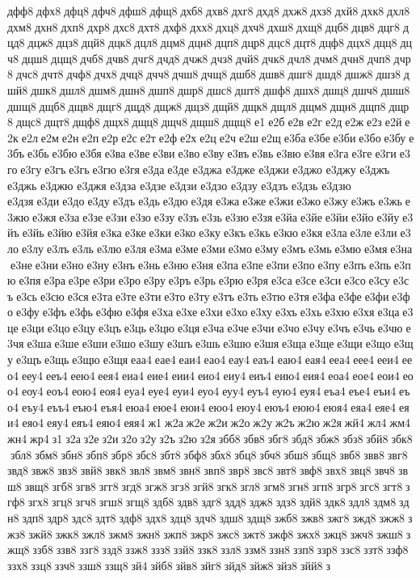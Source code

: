 дфф8 дфх8 дфц8 дфч8 дфш8 дфщ8 дхб8 дхв8 дхг8 дхд8 дхж8 дхз8 дхй8 дхк8 дхл8 дхм8 дхн8 дхп8 дхр8 дхс8 дхт8 дхф8 дхх8 дхц8 дхч8 дхш8 дхщ8 дцб8 дцв8 дцг8 дцд8 дцж8 дцз8 дцй8 дцк8 дцл8 дцм8 дцн8 дцп8 дцр8 дцс8 дцт8 дцф8 дцх8 дцц8 дцч8 дцш8 дцщ8 дчб8 дчв8 дчг8 дчд8 дчж8 дчз8 дчй8 дчк8 дчл8 дчм8 дчн8 дчп8 дчр8 дчс8 дчт8 дчф8 дчх8 дчц8 дчч8 дчш8 дчщ8 дшб8 дшв8 дшг8 дшд8 дшж8 дшз8 дшй8 дшк8 дшл8 дшм8 дшн8 дшп8 дшр8 дшс8 дшт8 дшф8 дшх8 дшц8 дшч8 дшш8 дшщ8 дщб8 дщв8 дщг8 дщд8 дщж8 дщз8 дщй8 дщк8 дщл8 дщм8 дщн8 дщп8 дщр8 дщс8 дщт8 дщф8 дщх8 дщц8 дщч8 дщш8 дщщ8 е1 е2б е2в е2г е2д е2ж е2з е2й е2к е2л е2м е2н е2п е2р е2с е2т е2ф е2х е2ц е2ч е2ш е2щ е3ба е3бе е3би е3бо е3бу е3бъ е3бь е3бю е3бя е3ва е3ве е3ви е3во е3ву е3въ е3вь е3вю е3вя е3га е3ге е3ги е3го е3гу е3гъ е3гь е3гю е3гя е3да е3де 	е3джа 	е3дже 	е3джи 	е3джо 	е3джу 	е3джъ 	е3джь 	е3джю 	е3джя 	е3дза 	е3дзе 	е3дзи 	е3дзо 	е3дзу 	е3дзъ 	е3дзь 	е3дзю 	е3дзя е3ди е3до е3ду е3дъ е3дь е3дю е3дя е3жа е3же е3жи е3жо е3жу е3жъ е3жь е3жю е3жя е3за е3зе е3зи е3зо е3зу е3зъ е3зь е3зю е3зя е3йа е3йе е3йи е3йо е3йу е3йъ е3йь е3йю е3йя е3ка е3ке е3ки е3ко е3ку е3къ е3кь е3кю е3кя е3ла е3ле е3ли е3ло е3лу е3лъ е3ль е3лю е3ля е3ма е3ме е3ми е3мо е3му е3мъ е3мь е3мю е3мя е3на е3не е3ни е3но е3ну е3нъ е3нь е3ню е3ня е3па е3пе е3пи е3по е3пу е3пъ е3пь е3пю е3пя е3ра е3ре е3ри е3ро е3ру е3ръ е3рь е3рю е3ря е3са е3се е3си е3со е3су е3съ е3сь е3сю е3ся е3та е3те е3ти е3то е3ту е3тъ е3ть е3тю е3тя е3фа е3фе е3фи е3фо е3фу е3фъ е3фь е3фю е3фя е3ха е3хе е3хи е3хо е3ху е3хъ е3хь е3хю е3хя е3ца е3це е3ци е3цо е3цу е3цъ е3ць е3цю е3ця е3ча е3че е3чи е3чо е3чу е3чъ е3чь е3чю е3чя е3ша е3ше е3ши е3шо е3шу е3шъ е3шь е3шю е3шя е3ща е3ще е3щи е3що е3щу е3щъ е3щь е3щю е3щя еаа4 еае4 еаи4 еао4 еау4 еаъ4 еаю4 еая4 ееа4 еее4 ееи4 еео4 ееу4 ееъ4 еею4 еея4 еиа4 еие4 еии4 еио4 еиу4 еиъ4 еию4 еия4 еоа4 еое4 еои4 еоо4 еоу4 еоъ4 еою4 еоя4 еуа4 еуе4 еуи4 еуо4 еуу4 еуъ4 еую4 еуя4 еъа4 еъе4 еъи4 еъо4 еъу4 еъъ4 еъю4 еъя4 еюа4 еюе4 еюи4 еюо4 еюу4 еюъ4 еюю4 еюя4 еяа4 еяе4 еяи4 еяо4 еяу4 еяъ4 еяю4 еяя4 ж1 ж2а ж2е ж2и ж2о ж2у ж2ъ ж2ю ж2я жй4 жл4 жм4 жн4 жр4 з1 з2а з2е з2и з2о з2у з2ъ з2ю з2я збб8 збв8 збг8 збд8 збж8 збз8 збй8 збк8 збл8 збм8 збн8 збп8 збр8 збс8 збт8 збф8 збх8 збц8 збч8 збш8 збщ8 звб8 звв8 звг8 звд8 звж8 звз8 звй8 звк8 звл8 звм8 звн8 звп8 звр8 звс8 звт8 звф8 звх8 звц8 звч8 звш8 звщ8 згб8 згв8 згг8 згд8 згж8 згз8 згй8 згк8 згл8 згм8 згн8 згп8 згр8 згс8 згт8 згф8 згх8 згц8 згч8 згш8 згщ8 здб8 здв8 здг8 здд8 здж8 здз8 здй8 здк8 здл8 здм8 здн8 здп8 здр8 здс8 здт8 здф8 здх8 здц8 здч8 здш8 здщ8 зжб8 зжв8 зжг8 зжд8 зжж8 зжз8 зжй8 зжк8 зжл8 зжм8 зжн8 зжп8 зжр8 зжс8 зжт8 зжф8 зжх8 зжц8 зжч8 зжш8 зжщ8 ззб8 ззв8 ззг8 ззд8 ззж8 ззз8 ззй8 ззк8 ззл8 ззм8 ззн8 ззп8 ззр8 ззс8 ззт8 ззф8 ззх8 ззц8 ззч8 ззш8 ззщ8 зй4 зйб8 зйв8 зйг8 зйд8 зйж8 зйз8 зйй8 з